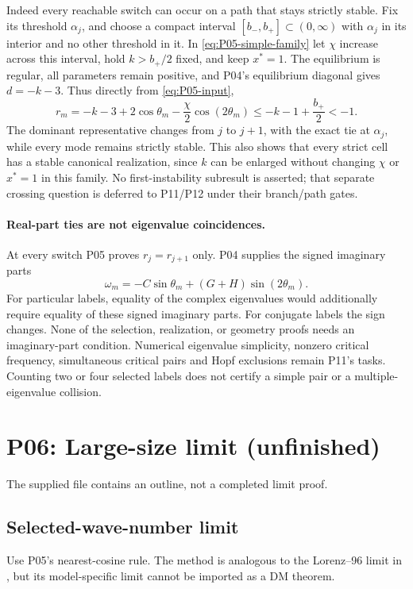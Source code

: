 \documentclass[11pt]{article}
\theoremstyle{definition}
\theoremstyle{remark}
\begin{document}
Indeed every reachable switch can occur on a path that stays strictly
stable. Fix its threshold $\alpha_j$, and choose a compact interval
$[b_-,b_+]\subset(0,\infty)$ with $\alpha_j$ in its interior and no
other threshold in it. In \eqref{eq:P05-simple-family} let $\chi$
increase across this interval, hold $k>b_+/2$ fixed, and keep $x^*=1$.
The equilibrium is regular, all parameters remain positive, and P04's
equilibrium diagonal gives $d=-k-3$. Thus directly from
\eqref{eq:P05-input},
\begin{equation}
 r_m=-k-3+2\cos\theta_m-\frac\chi2\cos(2\theta_m)
       \le-k-1+\frac{b_+}{2}<-1.
 \label{eq:P05-stable-switch}
\end{equation}
The dominant representative changes from $j$ to $j+1$, with the exact
tie at $\alpha_j$, while every mode remains strictly stable. This also
shows that every strict cell has a stable canonical realization, since
$k$ can be enlarged without changing $\chi$ or $x^*=1$ in this family.
No first-instability subresult is asserted; that separate crossing question
is deferred to P11/P12 under their branch/path gates.

\paragraph{Real-part ties are not eigenvalue coincidences.}
At every switch P05 proves $r_j=r_{j+1}$ only. P04 supplies the signed
imaginary parts
\[
 \omega_m=-C\sin\theta_m+(G+H)\sin(2\theta_m).
\]
For particular labels, equality of the complex eigenvalues would additionally
require equality of these signed imaginary parts. For conjugate labels the
sign changes. None of the selection, realization, or geometry proofs needs
an imaginary-part condition. Numerical eigenvalue simplicity, nonzero
critical frequency, simultaneous critical pairs and Hopf exclusions remain
P11's tasks. Counting two or four selected labels does not certify a simple
pair or a multiple-eigenvalue collision.


\section{P06: Large-size limit (unfinished)}
\label{sec:P06}
The supplied file contains an outline, not a completed limit proof.
\subsection{Selected-wave-number limit}\label{slot:P06-1}
Use P05's nearest-cosine rule. The method is analogous to the
Lorenz--96 limit in \cite[Proposition~6]{vanKekemSterk2018}, but
its model-specific limit cannot be imported as a DM theorem.
\end{document}
